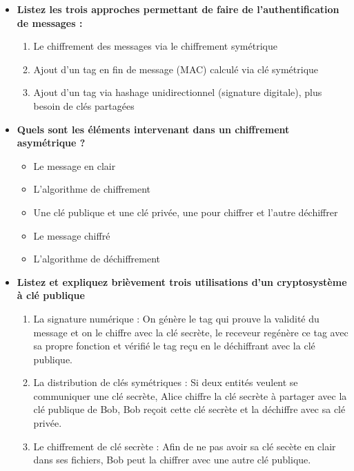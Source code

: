 \documentclass{report}
\begin{document}
\begin{itemize}
				\item \textbf{Listez les trois approches permettant de faire de l'authentification de messages :}\\

					\begin{enumerate}
						\item Le chiffrement des messages via le chiffrement symétrique
						\item Ajout d'un tag en fin de message (MAC) calculé via clé symétrique
						\item Ajout d'un tag via hashage unidirectionnel (signature digitale), plus besoin de clés partagées\\
					\end{enumerate}

				\item \textbf{Quels sont les éléments intervenant dans un chiffrement asymétrique ?}\\

					\begin{itemize}
						\item Le message en clair
						\item L'algorithme de chiffrement
						\item Une clé publique et une clé privée, une pour chiffrer et l'autre déchiffrer
						\item Le message chiffré
						\item L'algorithme de déchiffrement\\
					\end{itemize}

				\item \textbf{Listez et expliquez brièvement trois utilisations d'un cryptosystème à clé publique}\\

					\begin{enumerate}
						\item La signature numérique : On génère le tag qui prouve la validité du message et on le chiffre avec la clé secrète, le receveur regénère ce tag avec sa propre fonction et vérifié le tag reçu en le déchiffrant avec la clé publique.
						\item La distribution de clés symétriques : Si deux entités veulent se communiquer une clé secrète, Alice chiffre la clé secrète à partager avec la clé publique de Bob, Bob reçoit cette clé secrète et la déchiffre avec sa clé privée.
						\item Le chiffrement de clé secrète : Afin de ne pas avoir sa clé secète en clair dans ses fichiers, Bob peut la chiffrer avec une autre clé publique.\\
					\end{enumerate}


\end{itemize}
\end{document}
